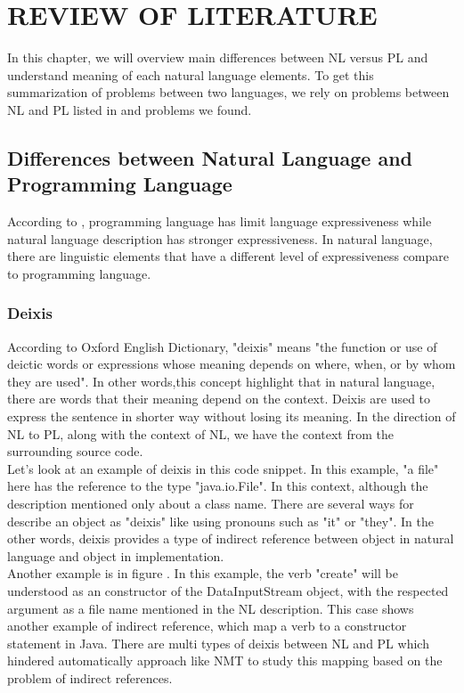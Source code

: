 \chapter{REVIEW OF LITERATURE}
In this chapter, we will overview main differences between NL versus PL and understand meaning of each natural language elements. To get this summarization of problems between two languages, we rely on problems between NL and PL listed in \cite{} and problems we found.
\section{Differences between Natural Language and Programming Language}
According to \cite{}, programming language has limit language expressiveness while natural language description has stronger expressiveness.  In natural language, there are linguistic elements that have a different level of expressiveness compare to programming language.
\subsection{Deixis}
According to Oxford English Dictionary, "deixis" means "the function or use of deictic words or expressions whose meaning depends on where, when, or by whom they are used". In other words,this concept highlight that in natural language, there are words that their meaning depend on the context. Deixis are used to express the sentence in  shorter way without losing its meaning. In the direction of NL to PL, along with the context of NL, we have the context from the surrounding source code. \\

Let's look at an example of deixis in this code snippet. In this example, "a file" here has the reference to the type "java.io.File". In this context, although the description mentioned only about a class name. There are several ways for describe an object as "deixis" like using pronouns such as "it" or "they". In the other words, deixis provides a type of indirect reference between object in natural language and object in implementation. \\

Another example is in figure \cite{}. In this example, the verb "create" will be understood as an constructor of the DataInputStream object, with the respected argument as a file name mentioned in the NL description. This case shows another example of indirect reference, which map a verb to a constructor statement in Java. There are multi types of deixis between NL and PL which hindered automatically approach like NMT to study this mapping based on the problem of indirect references. 

